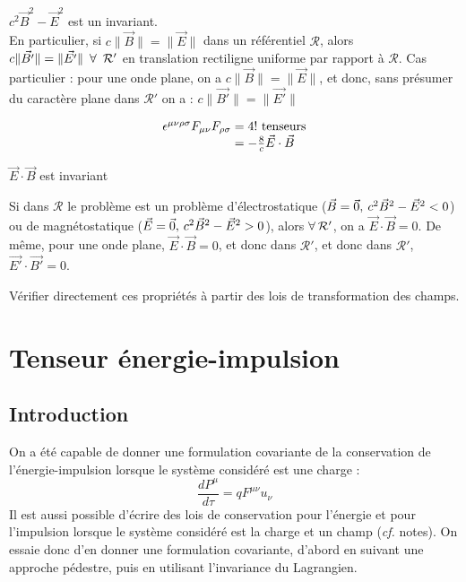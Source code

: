 \begin{conc}
	$c^2\vec{B}^2-\vec{E}^2$ est un invariant.\\
	En particulier, si $c\|\vec{B}\|=\|\vec{E}\|$ dans un référentiel $\mathcal{R}$, alors $c\|\vec{B'}\|=\|\vec{E'}\| \kern 5pt \forall \kern 5pt \mathcal{R'}$ en translation rectiligne uniforme par rapport à $\mathcal{R}$. Cas particulier : pour une onde plane, on a $c\|\vec{B}\|=\|\vec{E}\|$, et donc, sans présumer du caractère plane dans $\mathcal{R'}$ on a : $c\|\vec{B'}\|=\|\vec{E'}\|$
\end{conc}
$$
	\begin{array}{r@{\;}l}
		\epsilon^{\mu\nu\rho\sigma}F_{\mu\nu}F_{\rho\sigma} &= 4!\text{ tenseurs}\\
			&=-\frac{8}{c}\vec{E}\cdot\vec{B}
	\end{array}
$$
\begin{conc}
	$\vec{E}\cdot\vec{B}$ est invariant
\end{conc}
\begin{app}
	Si dans $\mathcal{R}$ le problème est un problème d'électrostatique ($\vec{B}=\vec{0}, \kern 2pt c^2\vec{B}^2-\vec{E}^2<0$) ou de magnétostatique ($\vec{E}=\vec{0}, \kern 2pt c^2\vec{B}^2-\vec{E}^2>0$), alors $\forall \kern 2pt \mathcal{R'}$, on a $\vec{E}\cdot\vec{B}=0$. De m\^eme, pour une onde plane, $\vec{E}\cdot\vec{B}=0$, et donc dans $\mathcal{R'}$, et donc dans $\mathcal{R'}$, $\vec{E'}\cdot\vec{B'}=0$.
\end{app}
\begin{exo}
	Vérifier directement ces propriétés à partir des lois de transformation des champs.
\end{exo}

\section{Tenseur énergie-impulsion}
\subsection{Introduction}
On a été capable de donner une formulation covariante de la conservation de l'énergie-impulsion lorsque le système considéré est une charge :
$$
	\frac{dP^\mu}{d\tau}=qF^{\mu\nu}u_\nu
$$
Il est aussi possible d'écrire des lois de conservation pour l'énergie et pour l'impulsion lorsque le système considéré est la charge et un champ (\emph{cf.} notes). On essaie donc d'en donner une formulation covariante, d'abord en suivant une approche pédestre, puis en utilisant l'invariance du Lagrangien.


